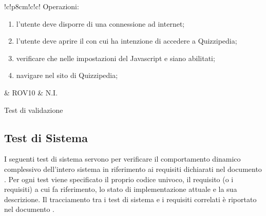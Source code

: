 \documentclass[a4paper, titlepage]{article}
\begin{document}
\begin{tabella}{!{\VRule}c!{\VRule}p{8cm}!{\VRule}c!{\VRule}c!{\VRule}}
		\newline \newline
		Operazioni:
		{\begin{enumerate}
				\item l’utente deve disporre di una connessione ad internet;
				\item l’utente deve aprire il  con cui ha intenzione di accedere a Quizzipedia;
				\item verificare che nelle impostazioni  del  Javascript e  siano abilitati;
				\item navigare nel sito di Quizzipedia; 
		\end{enumerate}
		}
	& ROV10 & N.I.
	\\
	\caption{Test di validazione}
\end{tabella}


\newpage
\subsection{Test di Sistema}
I seguenti test di sistema servono per verificare il comportamento dinamico complessivo dell'intero sistema in riferimento ai requisiti dichiarati nel documento .
\newline Per ogni test viene specificato il proprio codice univoco, il requisito (o i requisiti) a cui fa riferimento, lo stato di implementazione attuale e la sua descrizione.
\newline Il tracciamento tra i test di sistema e i requisiti correlati è riportato nel documento .
\end{document}
